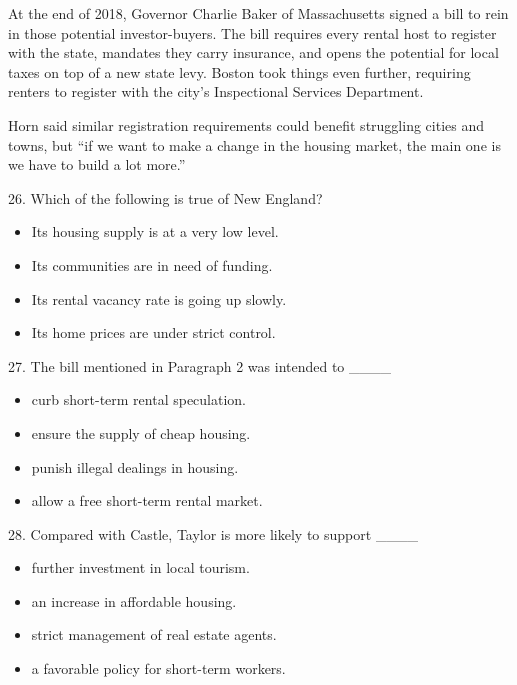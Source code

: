 \documentclass[UTF8,11pt]{ctexart}
\begin{document}
At the end of 2018, Governor Charlie Baker of Massachusetts signed a bill to rein in those potential investor-buyers. The bill requires every rental host to register with the state, mandates they carry insurance, and opens the potential for local taxes on top of a new state levy. Boston took things even further, requiring renters to register with the city’s Inspectional Services Department.


Horn said similar registration requirements could benefit struggling cities and towns, but “if we want to make a change in the housing market, the main one is we have to build a lot more.”


26. Which of the following is true of New England?


\begin{itemize}[leftmargin=2em,itemsep=.2em,topsep=.4em]\item[A.] Its housing supply is at a very low level.
\item[B.] Its communities are in need of funding.
\item[C.] Its rental vacancy rate is going up slowly.
\item[D.] Its home prices are under strict control.
\end{itemize}

27. The bill mentioned in Paragraph 2 was intended to \_\_\_\_


\begin{itemize}[leftmargin=2em,itemsep=.2em,topsep=.4em]\item[A.] curb short-term rental speculation.
\item[B.] ensure the supply of cheap housing.
\item[C.] punish illegal dealings in housing.
\item[D.] allow a free short-term rental market.
\end{itemize}

28. Compared with Castle, Taylor is more likely to support \_\_\_\_


\begin{itemize}[leftmargin=2em,itemsep=.2em,topsep=.4em]\item[A.] further investment in local tourism.
\item[B.] an increase in affordable housing.
\item[C.] strict management of real estate agents.
\item[D.] a favorable policy for short-term workers.
\end{itemize}
\end{document}

